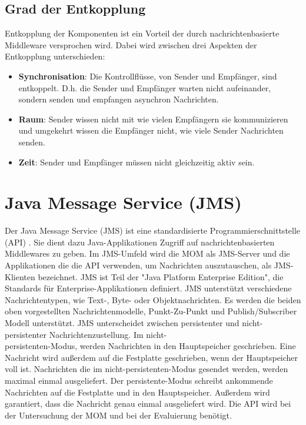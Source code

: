 \subsection{Grad der Entkopplung}
Entkopplung der Komponenten ist ein Vorteil der durch nachrichtenbasierte Middleware versprochen wird. Dabei wird zwischen drei Aspekten der Entkopplung \cite{Eugster03} unterschieden:
\begin{itemize}
    \item \textbf{Synchronisation}: Die Kontrollflüsse, von Sender und Empfänger, sind entkoppelt. D.h. die Sender und Empfänger warten nicht aufeinander, sondern senden und empfangen asynchron Nachrichten.
    \item \textbf{Raum}: Sender wissen nicht mit wie vielen Empfängern sie kommunizieren und umgekehrt wissen die Empfänger nicht, wie viele Sender Nachrichten senden.
    \item \textbf{Zeit}: Sender und Empfänger müssen nicht gleichzeitig aktiv sein.
\end{itemize}

\section{Java Message Service (JMS)}
Der Java Message Service (JMS) ist eine standardisierte Programmierschnittstelle (API) \cite{jmsspec}. Sie dient dazu Java-Applikationen Zugriff auf nachrichtenbasierten Middlewares zu geben. Im JMS-Umfeld wird die MOM als JMS-Server und die Applikationen die die API verwenden, um Nachrichten auszutauschen, als JMS-Klienten bezeichnet. JMS ist Teil der "Java Platform Enterprise Edition", die Standards für Enterprise-Applikationen definiert. JMS unterstützt verschiedene Nachrichtentypen, wie Text-, Byte- oder Objektnachrichten. Es werden die beiden oben vorgestellten Nachrichtenmodelle, Punkt-Zu-Punkt und Publish/Subscriber Modell unterstützt. JMS unterscheidet zwischen persistenter und nicht-persistenter Nachrichtenzustellung. Im nicht-\\persistenten-Modus, werden Nachrichten in den Hauptspeicher geschrieben. Eine Nachricht wird außerdem auf die Festplatte geschrieben, wenn der Hauptspeicher voll ist. Nachrichten die im nicht-persistenten-Modus gesendet werden, werden maximal einmal ausgeliefert. Der persistente-Modus schreibt ankommende Nachrichten auf die Festplatte und in den Hauptspeicher. Außerdem wird garantiert, dass die Nachricht genau einmal ausgeliefert wird. 
Die API wird bei der Untersuchung der MOM und bei der Evaluierung benötigt.


